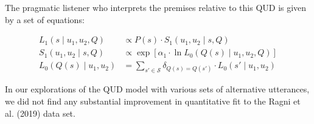 \documentclass[floatsintext, man]{apa6}
\begin{document}
The pragmatic listener who interprets the premises relative to this QUD is given by a set of equations:

\begin{align}
L_1(s \mid u_1,  u_2, Q)& \propto  P(s)\cdot S_1(u_1, u_2 \mid s, Q)  \label{eq:L1q} \\ 
S_1(u_1, u_2 \mid s, Q) &\propto  \exp [ \alpha_1 \cdot \ln L_0(Q(s) \mid u_1,  u_2, Q)]  \label{eq:S1q} \\
L_0(Q(s) \mid u_1,  u_2) & = \sum_{s' \in \mathcal{S}}  \delta_{Q(s)=Q(s')} \cdot L_0(s'\mid u_1,  u_2) \label{eq:L0q}
\end{align}

In our explorations of the QUD model with various sets of alternative utterances, we did not find any substantial improvement in quantitative fit to the Ragni et al. (2019) data set. 
\end{document}
